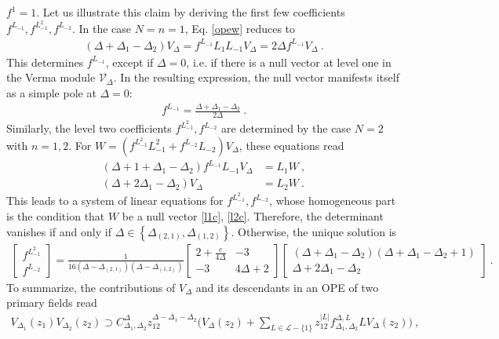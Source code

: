 \documentclass[12pt, a4paper]{article}
\theoremstyle{break}
\begin{document}
$f^{1}=1$. Let us illustrate this claim by deriving the first few coefficients $f^{L_{-1}},f^{L_{-1}^2},f^{L_{-2}}$. In the case $N=n=1$, Eq. \eqref{opew} reduces to
\begin{align}
 (\Delta+\Delta_1-\Delta_2)V_\Delta = f^{L_{-1}} L_1L_{-1}V_\Delta=2\Delta f^{L_{-1}}V_\Delta\ .
 \label{dddv}
\end{align}
This determines $f^{L_{-1}}$, except if $\Delta=0$, i.e. if there is a null vector at level one in the Verma module $\mathcal{V}_\Delta$. In the resulting expression, the null vector manifests itself as a simple pole at $\Delta=0$:
\begin{align}
 f^{L_{-1}} = \frac{\Delta+\Delta_1-\Delta_2}{2\Delta}\ . 
 \label{fl1}
\end{align}
Similarly, the level two coefficients $f^{L_{-1}^2},f^{L_{-2}}$ are determined by the case $N=2$ with $n=1,2$. For $W = \left(f^{L_{-1}^2}L_{-1}^2 + f^{L_{-2}}L_{-2}\right) V_\Delta$, these equations read 
\begin{align}
 (\Delta+1+\Delta_1-\Delta_2)f^{L_{-1}}L_{-1}V_\Delta  &= L_1W\ ,
 \label{el1c}
 \\
 (\Delta+2\Delta_1-\Delta_2)V_\Delta  &=L_2W \ .
 \label{el2c}
\end{align}
This leads to a system of linear equations for $f^{L_{-1}^2},f^{L_{-2}}$, whose homogeneous part is the condition that $W$ be a null vector \eqref{l1c}, \eqref{l2c}. Therefore, the determinant vanishes if and only if $\Delta\in \left\{\Delta_{(2,1)},\Delta_{(1,2)}\right\}$. Otherwise, the unique solution is
\begin{align}
 \left[\begin{smallmatrix}
 f^{L_{-1}^2} \\ f^{L_{-2}} 
 \end{smallmatrix}\right]
=
   \frac{1}{16(\Delta-\Delta_{(2,1)})(\Delta-\Delta_{(1,2)})}
\left[\begin{smallmatrix} 2+\frac{c}{4\Delta} & -3 \\ -3 & 4\Delta+2 \end{smallmatrix}\right]
\left[\begin{smallmatrix} (\Delta+\Delta_1-\Delta_2)(\Delta+\Delta_1-\Delta_2+1) \\ \Delta+2\Delta_1-\Delta_2 \end{smallmatrix}\right] \ .
\label{fl112}
 \end{align}
To summarize, the contributions of $V_\Delta$ and its descendants in an OPE of two primary fields read
\begin{align}
 \boxed{V_{\Delta_1}(z_1)V_{\Delta_2}(z_2) \supset  C_{\Delta_1,\Delta_2}^{\Delta} z_{12}^{\Delta-\Delta_1-\Delta_2} \Bigg(V_\Delta(z_2) +\sum_{L\in \mathcal{L}-\{1\}}z_{12}^{|L|} f^{\Delta,L}_{\Delta_1,\Delta_2} LV_\Delta(z_2)\Bigg)}
 \ ,
 \label{prope}
\end{align}
\end{document}
